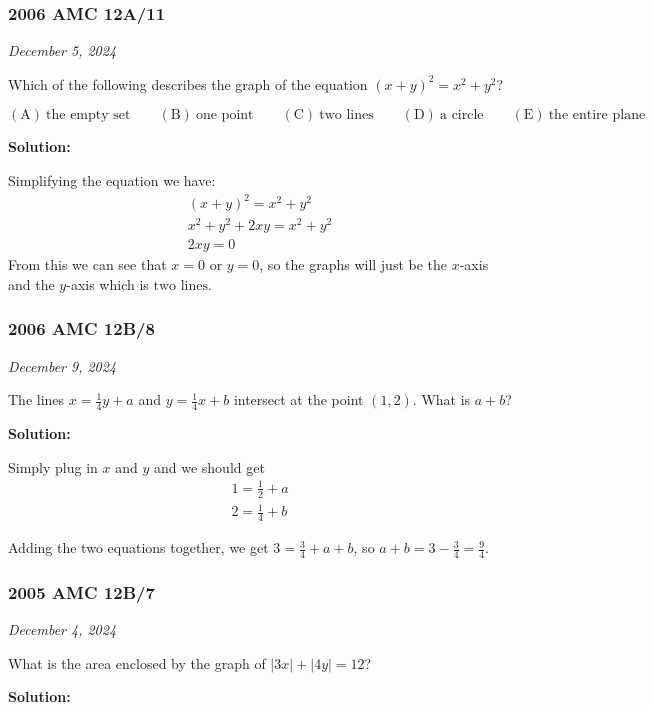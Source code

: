\documentclass[../mathproblems.tex]{subfiles}
\begin{document}
\noindent\hrulefill
\subsubsection*{2006 AMC 12A/11}
\textit{December 5, 2024}

Which of the following describes the graph of the equation $(x+y)^2=x^2+y^2$?

$\mathrm{(A)}\ \text{the empty set}\qquad\mathrm{(B)}\ \text{one point}\qquad\mathrm{(C)}\ \text{two lines}\qquad\mathrm{(D)}\ \text{a circle}\qquad\mathrm{(E)}\ \text{the entire plane}$ 

\textbf{Solution:}

Simplifying the equation we have:
\begin{align*}
    (x+y)^2=x^2+y^2\\
x^2+y^2+2xy=x^2+y^2 \\
2xy=0
\end{align*}
From this we can see that $x=0$ or $y=0$, so the graphs will just be the $x$-axis and the $y$-axis which is $\boxed{\text{two lines}}$.

\noindent\hrulefill

\subsubsection*{2006 AMC 12B/8}
\textit{December 9, 2024}

The lines $ x = \frac 14y + a$ and $ y = \frac 14x + b$ intersect at the point $ (1,2)$. What is $ a + b$?

\textbf{Solution:}

Simply plug in $x$ and $y$ and we should get 
\begin{align*}
    1 = \frac{1}{2} + a \\
    2 = \frac{1}{4} + b 
\end{align*}

Adding the two equations together, we get $3=\frac{3}{4}+a+b$, so $a+b = 3-\frac{3}{4} = \boxed{\frac{9}{4}}$.

\noindent\hrulefill



\subsubsection*{2005 AMC 12B/7} 
\textit{December 4, 2024}

What is the area enclosed by the graph of $|3x|+|4y|=12$?

\textbf{Solution:}
\end{document}
